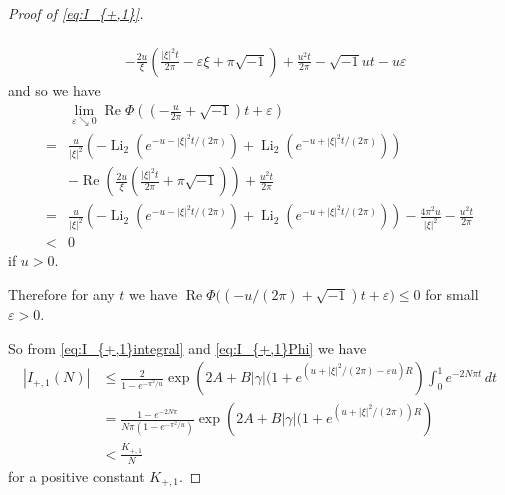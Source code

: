 \documentclass[a4paper]{amsart}
\theoremstyle{plain}
\theoremstyle{definition}
\theoremstyle{remark}
\newcommand{\Li}{\operatorname{Li}}
\renewcommand{\Re}{\operatorname{Re}}
\numberwithin{equation}{section}
\begin{document}
\begin{proof}[Proof of \eqref{eq:I_{+,1}}]
\begin{itemize}
\begin{equation*}
\begin{split}
  \\
  &
  -\frac{2u}{\xi}
  \left(
    \frac{|\xi|^2t}{2\pi}-\varepsilon\xi+\pi\sqrt{-1}
  \right)
  +
  \frac{u^2t}{2\pi}-\sqrt{-1}ut-u\varepsilon
\end{split}
\end{equation*}
and so we have
\begin{equation*}
\begin{split}
  &\lim_{\varepsilon\searrow0}
  \Re\Phi\left(\left(-\frac{u}{2\pi}+\sqrt{-1}\right)t+\varepsilon\right)
  \\
  =&
  \frac{u}{|\xi|^2}
  \left(
    -
    \Li_2(e^{-u-|\xi|^2t/(2\pi)})
    +
    \Li_2(e^{-u+|\xi|^2t/(2\pi)})
  \right)
  \\
  &
  -\Re
  \left(
    \frac{2u}{\xi}
    \left(
      \frac{|\xi|^2t}{2\pi}+\pi\sqrt{-1}
    \right)
  \right)
  +
  \frac{u^2t}{2\pi}  \\
  =&
  \frac{u}{|\xi|^2}
  \left(
    -
    \Li_2(e^{-u-|\xi|^2t/(2\pi)})
    +
    \Li_2(e^{-u+|\xi|^2t/(2\pi)})
  \right)
  -\frac{4\pi^2u}{|\xi|^2}-\frac{u^2t}{2\pi}
  \\
  <&0
\end{split}
\end{equation*}
if $u>0$.
\end{itemize}
Therefore for any $t$ we have $\Re\Phi\bigl((-u/(2\pi)+\sqrt{-1})t+\varepsilon\bigr)\le0$ for small $\varepsilon>0$.
\par
So from \eqref{eq:I_{+,1}integral} and \eqref{eq:I_{+,1}Phi} we have
\begin{equation*}
\begin{split}
  \left|I_{+,1}(N)\right|
  &\le
  \frac{2}{1-e^{-\pi^2/u}}
  \exp\left(2A+B|\gamma|(1+e^{(u+|\xi|^2/(2\pi)-\varepsilon u)R}\right)
  \int_{0}^{1}e^{-2N\pi t}\,dt
  \\
  &=
  \frac{1-e^{-2N\pi}}{N\pi(1-e^{-\pi^2/u})}
  \exp\left(2A+B|\gamma|(1+e^{(u+|\xi|^2/(2\pi))R}\right)
  \\
  &<
  \frac{K_{+,1}}{N}
\end{split}
\end{equation*}
for a positive constant $K_{+,1}$.
\end{proof}%
\end{document}
